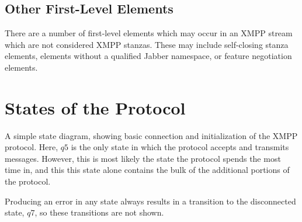\documentclass{article}
\begin{document}
\subsection{Other First-Level Elements}
There are a number of first-level elements which may occur in an XMPP stream
which are not considered XMPP stanzas. These may include self-closing stanza
elements, elements without a qualified Jabber namespace, or feature negotiation
elements.

\section{States of the Protocol}
A simple state diagram, showing basic connection and initialization of the XMPP
protocol. Here, $q5$ is the only state in which the protocol accepts and
transmits messages. However, this is most likely the state the protocol spends
the most time in, and this this state alone contains the bulk of the additional
portions of the protocol.

Producing an error in any state always results in a transition to the
disconnected state, $q7$, so these transitions are not shown.
\end{document}
